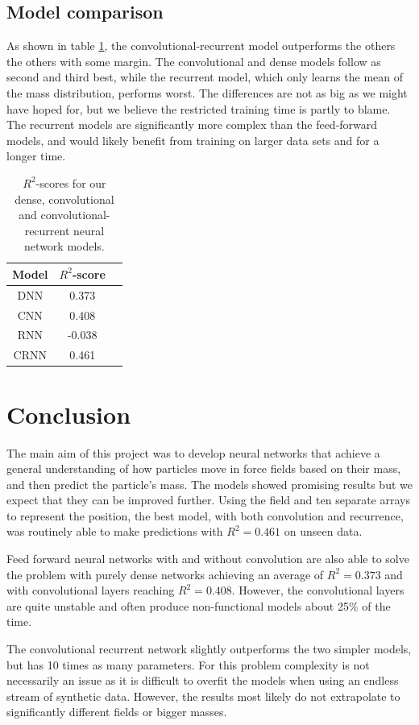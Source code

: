 \documentclass[a4paper]{article}
\begin{document}
\subsection{Model comparison}
As shown in table \ref{tab:model_comparison}, the convolutional-recurrent model outperforms the others the others with some margin. The convolutional and dense models follow as second and third best, while the recurrent model, which only learns the mean of the mass distribution, performs worst. The differences are not as big as we might have hoped for, but we believe the restricted training time is partly to blame. The recurrent models are significantly more complex than the feed-forward models, and would likely benefit from training on larger data sets and for a longer time.

\begin{table}
    \centering
    \caption{$R^2$-scores for our dense, convolutional and convolutional-recurrent neural network models.}
    \begin{tabular}{c  c  c}
    Model & $R^2$-score \\
    \hline
    DNN  & 0.373 \\
    CNN  & 0.408 \\
    RNN  & -0.038 \\
    CRNN & 0.461
    \end{tabular}
    \label{tab:model_comparison}
\end{table}

\section{Conclusion}
The main aim of this project was to develop neural networks that achieve a general understanding of how particles move in force fields based on their mass, and then predict the particle's mass. The models showed promising results but we expect that they can be improved further. Using the field and ten separate arrays to represent the position, the best model, with both convolution and recurrence, was routinely able to make predictions with $R^2=0.461$ on unseen data.

Feed forward neural networks with and without convolution are also able to solve the problem with purely dense networks achieving an average of $R^2=0.373$ and with convolutional layers reaching $R^2= 0.408$. However, the convolutional layers are quite unstable and often produce non-functional models about 25\% of the time. 

The convolutional recurrent network slightly outperforms the two simpler models, but has 10 times as many parameters. For this problem complexity is not necessarily an issue as it is difficult to overfit the models when using an endless stream of synthetic data. However, the results most likely do not extrapolate to significantly different fields or bigger masses. 
\end{document}
